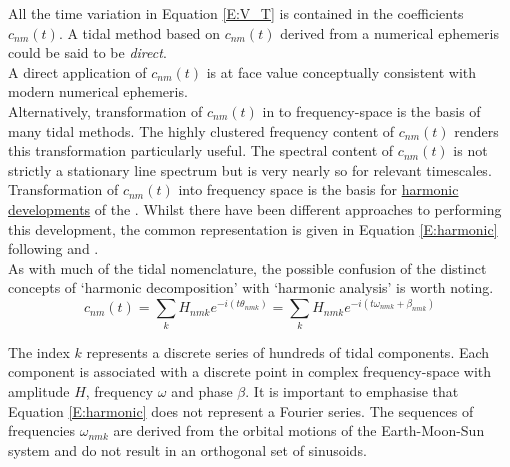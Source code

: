 All the time variation in Equation \ref{E:V_T} is contained in the coefficients $c_{nm}(t)$.  A tidal method based on $c_{nm}(t)$ derived from a numerical ephemeris could be said to be \emph{direct}.\\
A direct application of $c_{nm}(t)$ is at face value conceptually consistent with modern numerical ephemeris.\\



Alternatively, transformation of $c_{nm}(t)$ in to frequency-space is the basis of many tidal methods.   The highly clustered frequency content of $c_{nm}(t)$ renders this transformation particularly useful.  The spectral content of $c_{nm}(t)$ is not strictly a stationary line spectrum but is very nearly so for relevant timescales.\\
Transformation of $c_{nm}(t)$ into frequency space is the basis for \underline{harmonic developments} of the \ATGP{}. Whilst there have been different approaches to performing this development, the common representation is given in Equation \ref{E:harmonic} following \citep{Desai:2006wo} and \citep[Eq 13]{Cartwright:1971iz}.\\
As with much of the tidal nomenclature, the possible confusion of the distinct concepts of `harmonic decomposition' with `harmonic analysis' is worth noting.
\begin{equation}
\label{E:harmonic}
c_{nm}(t) = \sum_{k} H_{nmk} e^{-i( t\theta_{nmk})} = \sum_{k} H_{nmk} e^{-i( t\omega_{nmk} + \beta_{nmk})}
\end{equation}


The index $k$ represents a discrete series of hundreds of tidal components.  Each component is associated with a discrete point in complex frequency-space with amplitude $H$, frequency $\omega$ and phase $\beta$.
It is important to emphasise that Equation \ref{E:harmonic} does not represent a Fourier series.  The sequences of frequencies $\omega_{nmk}$ are derived from the orbital motions of the Earth-Moon-Sun system and do not result in an orthogonal set of sinusoids.\\



